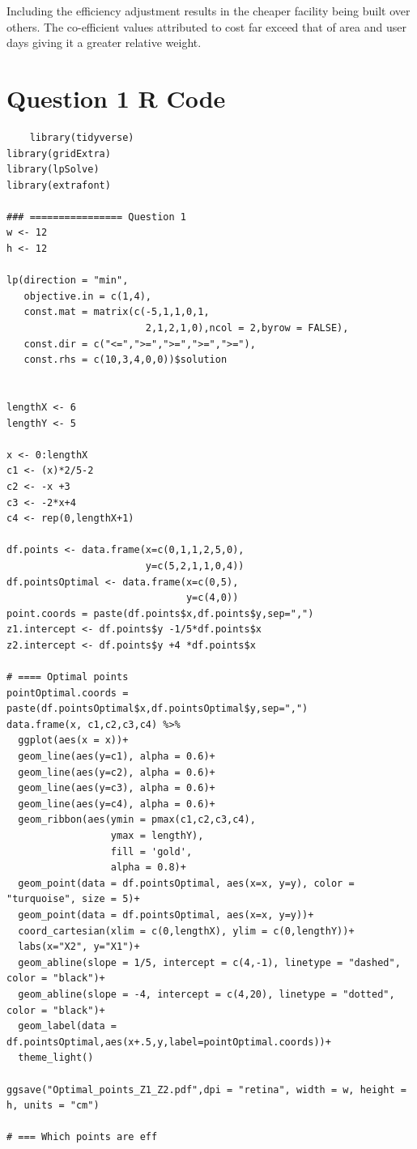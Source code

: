 \documentclass[a4paper,11pt]{article}
\begin{document}
Including the efficiency adjustment results in the cheaper facility being built over others. The co-efficient values attributed to cost far exceed that of area and user days giving it a greater relative weight.
\newpage
\section{Question 1 R Code}
\begin{verbatim}
	library(tidyverse)
library(gridExtra)
library(lpSolve)
library(extrafont) 

### ================ Question 1 
w <- 12
h <- 12

lp(direction = "min",
   objective.in = c(1,4),
   const.mat = matrix(c(-5,1,1,0,1,
                        2,1,2,1,0),ncol = 2,byrow = FALSE),
   const.dir = c("<=",">=",">=",">=",">="),
   const.rhs = c(10,3,4,0,0))$solution


lengthX <- 6
lengthY <- 5

x <- 0:lengthX
c1 <- (x)*2/5-2
c2 <- -x +3
c3 <- -2*x+4
c4 <- rep(0,lengthX+1)

df.points <- data.frame(x=c(0,1,1,2,5,0),
                        y=c(5,2,1,1,0,4))
df.pointsOptimal <- data.frame(x=c(0,5),
                               y=c(4,0))
point.coords = paste(df.points$x,df.points$y,sep=",")
z1.intercept <- df.points$y -1/5*df.points$x
z2.intercept <- df.points$y +4 *df.points$x

# ==== Optimal points
pointOptimal.coords = paste(df.pointsOptimal$x,df.pointsOptimal$y,sep=",")
data.frame(x, c1,c2,c3,c4) %>% 
  ggplot(aes(x = x))+
  geom_line(aes(y=c1), alpha = 0.6)+
  geom_line(aes(y=c2), alpha = 0.6)+
  geom_line(aes(y=c3), alpha = 0.6)+
  geom_line(aes(y=c4), alpha = 0.6)+
  geom_ribbon(aes(ymin = pmax(c1,c2,c3,c4),
                  ymax = lengthY),
                  fill = 'gold', 
                  alpha = 0.8)+
  geom_point(data = df.pointsOptimal, aes(x=x, y=y), color = "turquoise", size = 5)+
  geom_point(data = df.pointsOptimal, aes(x=x, y=y))+
  coord_cartesian(xlim = c(0,lengthX), ylim = c(0,lengthY))+
  labs(x="X2", y="X1")+
  geom_abline(slope = 1/5, intercept = c(4,-1), linetype = "dashed", color = "black")+
  geom_abline(slope = -4, intercept = c(4,20), linetype = "dotted", color = "black")+
  geom_label(data = df.pointsOptimal,aes(x+.5,y,label=pointOptimal.coords))+
  theme_light()

ggsave("Optimal_points_Z1_Z2.pdf",dpi = "retina", width = w, height = h, units = "cm")

# === Which points are eff


\end{verbatim}
\end{document}
